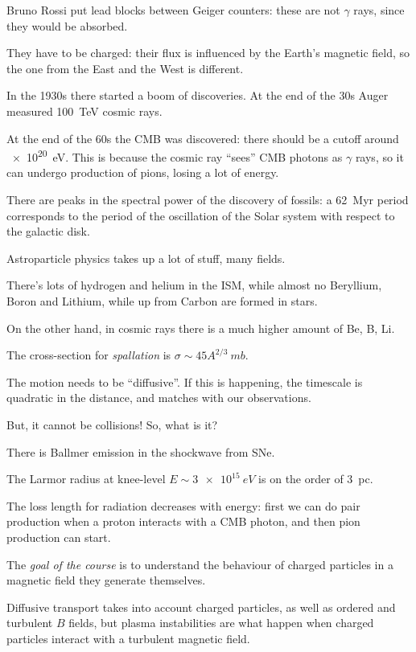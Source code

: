 \documentclass[main.tex]{subfiles}
\begin{document}
Bruno Rossi put lead blocks between Geiger counters: these are not \(\gamma \) rays, since
they would be absorbed. 

They have to be charged: their flux is influenced by the Earth's magnetic field, so 
the one from the East and the West is different. 

In the 1930s there started a boom of discoveries. 
At the end of the 30s Auger measured \SI{100}{TeV} cosmic rays. 

At the end of the 60s the CMB was discovered: 
there should be a cutoff around \SI{e20}{eV}. 
This is because the cosmic ray ``sees'' CMB photons as \(\gamma \) rays, so  
it can undergo production of pions, losing a lot of energy. 

There are peaks in the spectral power of the discovery of fossils: 
a \SI{62}{Myr} period corresponds to the period of the oscillation of the Solar system 
with respect to the galactic disk. 

Astroparticle physics takes up a lot of stuff, many fields. 

There's lots of hydrogen and helium in the ISM, 
while almost no Beryllium, Boron and Lithium, 
while up from Carbon are formed in stars. 

On the other hand, in cosmic rays there is a much higher amount of 
Be, B, Li.

The cross-section for \emph{spallation} is \(\sigma \sim 45 A^{2/3} \SI{}{mb}\). 

The motion needs to be ``diffusive''. If this is happening, 
the timescale is quadratic in the distance, and matches with our observations. 

But, it cannot be collisions! 
So, what is it? 

There is Ballmer emission in the shockwave from SNe. 

The Larmor radius at knee-level \(E \sim \SI{3e15}{eV}\) is on the order of \SI{3}{pc}. 

The loss length for radiation decreases with energy: first we can do pair production when
a proton interacts with a CMB photon, and then pion production can start. 

The \emph{goal of the course} is to understand the behaviour of 
charged particles in a magnetic field they generate themselves. 

Diffusive transport  takes into account charged particles, as well 
as ordered and turbulent \(B\) fields, but 
plasma instabilities are what happen when charged particles interact with a 
turbulent magnetic field. 
\end{document}
